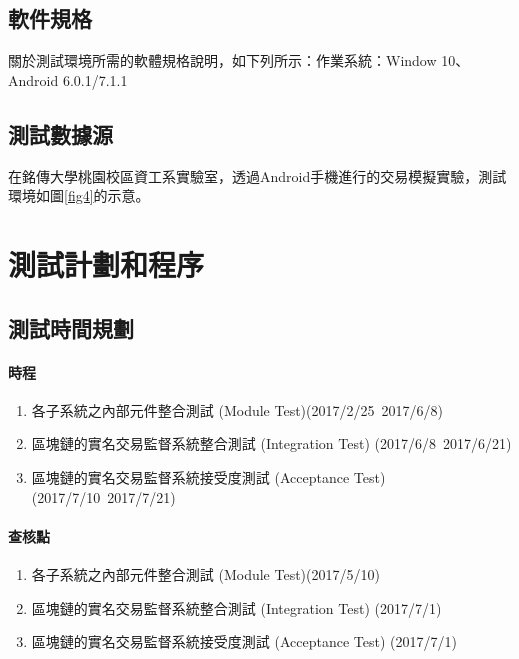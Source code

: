  		\subsection{軟件規格}
 		關於測試環境所需的軟體規格說明，如下列所示：作業系統：Window 10、Android 6.0.1/7.1.1

 		\subsection{測試數據源}
 		在銘傳大學桃園校區資工系實驗室，透過Android手機進行的交易模擬實驗，測試環境如圖\ref{fig4}的示意。

 	\section{測試計劃和程序}

 		\subsection{測試時間規劃}

 		\paragraph{時程}

 			\begin{enumerate}
 				\item 各子系統之內部元件整合測試 (Module Test)(2017/2/25~2017/6/8)
 				\item 區塊鏈的實名交易監督系統整合測試 (Integration Test) (2017/6/8~2017/6/21)
 				\item 區塊鏈的實名交易監督系統接受度測試 (Acceptance Test) (2017/7/10~2017/7/21)
			\end{enumerate}

		\paragraph{查核點}

			\begin{enumerate}
 				\item 各子系統之內部元件整合測試 (Module Test)(2017/5/10)
 				\item 區塊鏈的實名交易監督系統整合測試 (Integration Test) (2017/7/1)
 				\item 區塊鏈的實名交易監督系統接受度測試 (Acceptance Test) (2017/7/1)
 			\end{enumerate}

